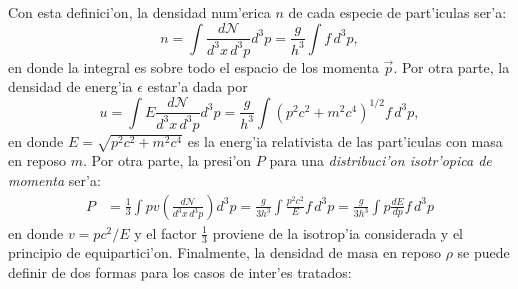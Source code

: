 Con esta definici'on, la densidad num'erica $n$ de cada especie de part'iculas ser'a:
\begin{equation}\label{densidad_dist}
 n=\int\frac{d\mathcal{N}}{d^3x\,d^3p}d^3p=\frac{g}{h^3}\int f\,d^3p,
\end{equation}
en donde la integral es sobre todo el espacio de los momenta $\vec{p}$. Por otra parte, la densidad de energ'ia $\epsilon$ estar'a dada por
\begin{equation}\label{energia_dist}
 u=\int E\frac{d\mathcal{N}}{d^3x\,d^3p}d^3p=\frac{g}{h^3}\int \left(p^2c^2+m^2c^4\right)^{1/2}f\,d^3p,
\end{equation}
en donde $E=\sqrt{p^2 c^2+m^2 c^4}$ es la energ'ia relativista de las part'iculas con masa en reposo $m$. Por otra parte, la presi'on $P$ para una \textit{distribuci'on isotr'opica de momenta} ser'a:
\begin{align}
 P&=\frac{1}{3}\int pv\left(\frac{d\mathcal{N}}{d^3x\,d^3p}\right)d^3p=\frac{g}{3h^3}\int \frac{p^2c^2}{E}f\,d^3p
 =\frac{g}{3h^3}\int p\frac{dE}{dp}f\,d^3p\label{presion_dist2}
\end{align}
en donde $v=pc^2/E$ y el factor $\frac{1}{3}$ proviene de la isotrop'ia considerada y el principio de equipartici'on. Finalmente, la densidad de masa en reposo $\rho$ se puede definir de dos formas para los casos de inter'es tratados:
